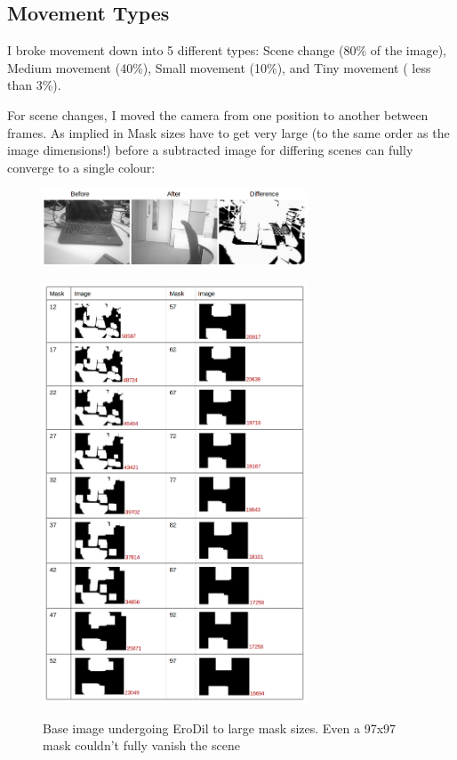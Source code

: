 {{\subsection{Movement Types}
I broke movement down into 5 different types:  Scene change (80\% of the image), Medium movement (40\%), Small movement (10\%), and Tiny movement ( less than 3\%).

For scene changes, I moved the camera from one position to another between frames. As implied in Mask sizes have to get very large (to the same order as the image dimensions!) before a subtracted image for differing scenes can  fully converge to a single colour:

\begin{figure}[H]
        \vspace{-20pt}
        \begin{center}
                \includegraphics[width=0.7\textwidth]{../images/ImageOps/Diff1}
                \label{img:diff1}
        \end{center}
        \vspace{-20pt}
        \begin{center}
                \includegraphics[width=0.7\textwidth]{../images/ImageOps/Diff2}
                \label{img:diff2}
        \end{center}
        \vspace{-20pt}
        \caption{Base image undergoing EroDil to large mask sizes. Even a 97x97 mask couldn’t fully vanish the scene}
	\vspace{-40pt}
\end{figure}

}}
